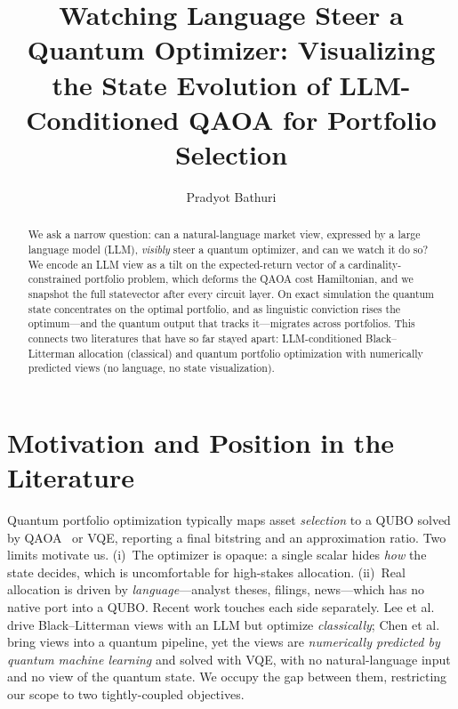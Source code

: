 \documentclass[runningheads]{llncs}
\begin{document}
\title{Watching Language Steer a Quantum Optimizer: Visualizing the State Evolution of
LLM-Conditioned QAOA for Portfolio Selection}
\author{Pradyot Bathuri}
\maketitle

\begin{abstract}
We ask a narrow question: can a natural-language market view, expressed by a large language model (LLM),
\emph{visibly} steer a quantum optimizer, and can we watch it do so? We encode an LLM view as a tilt on
the expected-return vector of a cardinality-constrained portfolio problem, which deforms the QAOA cost
Hamiltonian, and we snapshot the full statevector after every circuit layer. On exact simulation the
quantum state concentrates on the optimal portfolio, and as linguistic conviction rises the optimum---and
the quantum output that tracks it---migrates across portfolios. This connects two literatures that have
so far stayed apart: LLM-conditioned Black--Litterman allocation (classical) and quantum portfolio
optimization with numerically predicted views (no language, no state visualization).
\end{abstract}

\section{Motivation and Position in the Literature}
Quantum portfolio optimization typically maps asset \emph{selection} to a QUBO solved by
QAOA~\cite{farhi2014qaoa} or VQE, reporting a final bitstring and an approximation ratio. Two limits
motivate us. (i)~The optimizer is opaque: a single scalar hides \emph{how} the state decides, which is
uncomfortable for high-stakes allocation. (ii)~Real allocation is driven by \emph{language}---analyst
theses, filings, news---which has no native port into a QUBO. Recent work touches each side separately.
Lee et al.~\cite{lee2025llmbl} drive Black--Litterman views with an LLM but optimize \emph{classically};
Chen et al.~\cite{chen2023qbl} bring views into a quantum pipeline, yet the views are \emph{numerically
predicted by quantum machine learning} and solved with VQE, with no natural-language input and no view of
the quantum state. We occupy the gap between them, restricting our scope to two tightly-coupled objectives.
\end{document}
